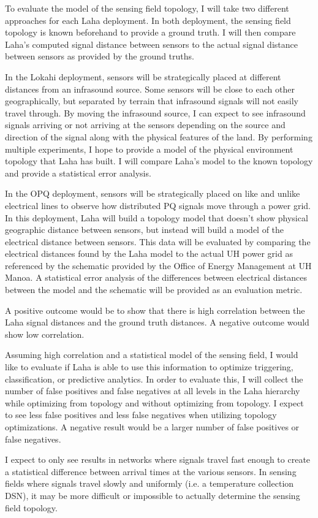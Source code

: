 To evaluate the model of the sensing field topology, I will take two different approaches for each Laha deployment. In both deployment, the sensing field topology is known beforehand to provide a ground truth. I will then compare Laha's computed signal distance between sensors to the actual signal distance between sensors as provided by the ground truths.

In the Lokahi deployment, sensors will be strategically placed at different distances from an infrasound source. Some sensors will be close to each other geographically, but separated by terrain that infrasound signals will not easily travel through. By moving the infrasound source, I can expect to see infrasound signals arriving or not arriving at the sensors depending on the source and direction of the signal along with the physical features of the land. By performing multiple experiments, I hope to provide a model of the physical environment topology that Laha has built. I will compare Laha's model to the known topology and provide a statistical error analysis. 

In the OPQ deployment, sensors will be strategically placed on like and unlike electrical lines to observe how distributed PQ signals move through a power grid. In this deployment, Laha will build a topology model that doesn't show physical geographic distance between sensors, but instead will build a model of the electrical distance between sensors. This data will be evaluated by comparing the electrical distances found by the Laha model to the actual UH power grid as referenced by the schematic provided by the Office of Energy Management at UH Manoa. A statistical error analysis of the differences between electrical distances between the model and the schematic will be provided as an evaluation metric.

A positive outcome would be to show that there is high correlation between the Laha signal distances and the ground truth distances. A negative outcome would show low correlation.

Assuming high correlation and a statistical model of the sensing field, I would like to evaluate if Laha is able to use this information to optimize triggering, classification, or predictive analytics. In order to evaluate this, I will collect the number of false positives and false negatives at all levels in the Laha hierarchy while optimizing from topology and without optimizing from topology. I expect to see less false positives and less false negatives when utilizing topology optimizations. A negative result would be a larger number of false positives or false negatives.

I expect to only see results in networks where signals travel fast enough to create a statistical difference between arrival times at the various sensors. In sensing fields where signals travel slowly and uniformly (i.e. a temperature collection DSN), it may be more difficult or impossible to actually determine the sensing field topology.
